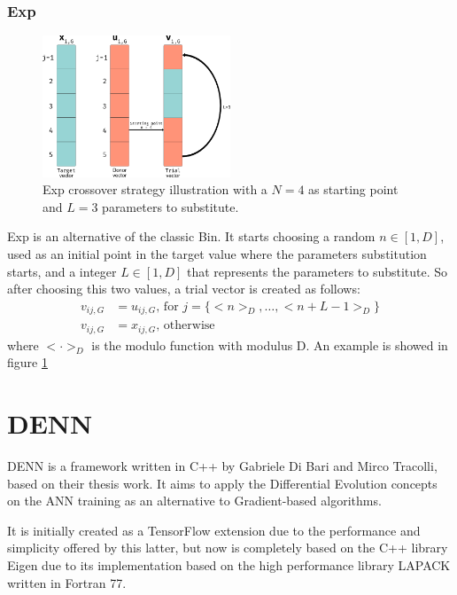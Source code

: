 \subsubsection{Exp}
\begin{figure}[h!]
	\centering
	\includegraphics[width=0.5\textwidth]{figures/de-exp.png}
	\caption{Exp crossover strategy illustration with a $N = 4$ as starting point and $L = 3$ parameters to substitute.}
	\label{fig:exp-crossover}
\end{figure}
Exp is an alternative of the classic Bin. It starts choosing a random $n \in [1, D]$, used as an initial point in the target value where the parameters substitution starts, and a integer $L \in [1, D]$ that represents the parameters to substitute. So after choosing this two values, a trial vector is created as follows:
\begin{align}
	v_{ij, G} &= u_{ij, G}\textrm{,  for } j = \{<n>_{D}, \dots, <n + L - 1>_{D}\} \\
	v_{ij, G} &= x_{ij, G}\textrm{,  otherwise}
\end{align} 
where $< \cdot >_{D}$ is the modulo function with modulus D. An example is showed in figure \ref{fig:exp-crossover}

\section{DENN}\label{sec:DENN}
DENN is a framework written in C++ by Gabriele Di Bari and Mirco Tracolli, based on their thesis work. It aims to apply the Differential Evolution concepts on the ANN training as an alternative to Gradient-based algorithms. 

It is initially created as a TensorFlow extension due to the performance and simplicity offered by this latter, but now is completely based on the C++ library Eigen due to its implementation based on the high performance library LAPACK written in Fortran 77.

